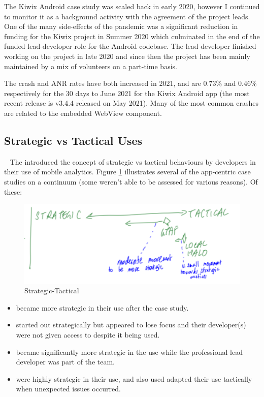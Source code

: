 The Kiwix Android case study was scaled back in early 2020, however I continued to monitor it as a background activity with the agreement of the project leads. One of the many side-effects of the  pandemic was a significant reduction in funding for the Kiwix project in Summer 2020 which culminated in the end of the funded lead-developer role for the Android codebase. The lead developer finished working on the project in late 2020 and since then the project has been mainly maintained by a mix of volunteers on a part-time basis. 

The crash and ANR rates have both increased in 2021, and are 0.73\% and 0.46\% respectively for the 30 days to  June 2021 for the Kiwix Android app (the most recent release is v3.4.4 released on  May 2021). Many of the most common crashes are related to the embedded WebView component.

\subsection{Strategic vs Tactical Uses}~\label{aiu-strategic-vs-tactical-uses-topic}
The  introduced the concept of strategic vs tactical behaviours by developers in their use of mobile analytics. Figure \ref{fig:aiu-strategic-tactical-example} illustrates several of the app-centric case studies on a continuum (some weren't able to be assessed for various reasons). Of these:

\begin{figure}
    \centering
    \includegraphics[width=\linewidth]{images/rough-sketches/aiu-strategic-tactical-example.pdf}
    \caption{Strategic-Tactical}
    \label{fig:aiu-strategic-tactical-example}
\end{figure}

\begin{itemize}
    \item {} became more strategic in their use after the case study.
    \item {} started out strategically but appeared to lose focus and their developer(s) were not given access to  despite it being used.
    \item {} became significantly more strategic in the use  while the professional lead developer was part of the team.
    \item {} were highly strategic in their use, and also used adapted their use tactically when unexpected issues occurred.
\end{itemize}


